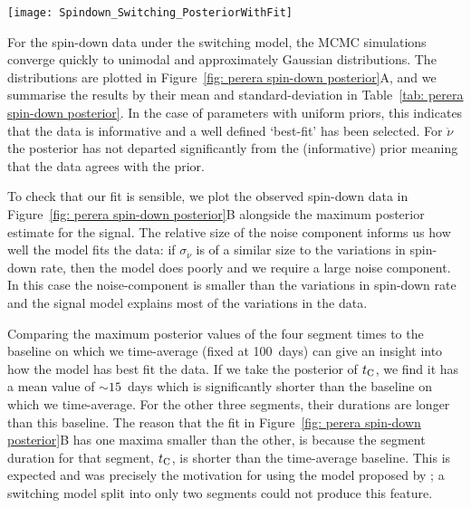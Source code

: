 \documentclass[../full_thesis/full_thesis.tex]{subfiles}
\newcommand{\thisdir}{../comparing_periodic_modulations}
\newcommand{\bigfigurecaptions}[2]{
$\textbf{A}$: The estimated marginal posterior probability distribution for the
#1 #2 model parameters. $\textbf{B}$: Checking the fit of the model using the
maximum posterior values to the data; see Figure~\ref{fig: noise-only beam-width
posterior fit} for a complete description.}
\begin{document}
\begin{figure*}
\centering
\texttt{[image: Spindown\_Switching\_PosteriorWithFit]}
\caption{\bigfigurecaptions{Switching}{spin-down}}
\label{fig: perera spin-down posterior}
\end{figure*}

For the spin-down data under the switching model, the MCMC simulations converge
quickly to unimodal and approximately Gaussian distributions. The distributions are plotted
in Figure~\ref{fig: perera spin-down posterior}A, and we summarise the results by
their mean and standard-deviation in Table~\ref{tab: perera spin-down
posterior}. In the case of parameters with uniform priors, this indicates that the data
is informative and a well defined `best-fit' has been selected. For $\ddot{\nu}$
the posterior has not departed significantly from the (informative) prior meaning that the
data agrees with the prior.
\begin{table}
\centering
\caption{Posterior estimates for the spin-down switching model.}
\label{tab: perera spin-down posterior}

\end{table}

To check that our fit is sensible, we plot the observed spin-down data in
Figure~\ref{fig: perera spin-down posterior}B alongside the maximum posterior
estimate for the signal. The relative size of the noise component informs us
how well the model fits the data: if $\sigma_{\dot{\nu}}$ is of a similar size
to the variations in spin-down rate, then the model does poorly and we require
a large noise component. In this case the noise-component is smaller than the
variations in spin-down rate and the signal model explains most of the
variations in the data.

Comparing the maximum posterior values of the four segment times to the
baseline on which we time-average (fixed at 100~days) can give an insight into how the
model has best fit the data. If we take the posterior of $t_{\mathrm{C}}$, we find it
has a mean value of $\sim 15$~days which is significantly shorter than the
baseline on which we time-average. For the other three segments, their durations are
longer than this baseline. The reason that the fit in Figure~\ref{fig: perera
spin-down posterior}B has one maxima smaller than the other, is because the
segment duration for that segment, $t_{\mathrm{C}}$, is shorter than the time-average
baseline. This is expected and was precisely the motivation for using the model
proposed by \citet{Perera2015}; a switching model split into only two segments
could not produce this feature.
\end{document}
